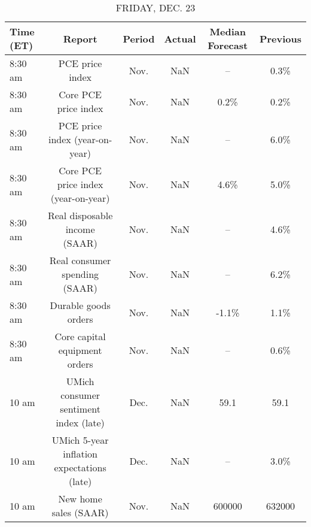 \documentclass{article}%
\begin{document}
\begin{table}[htbp]%
\caption{FRIDAY, DEC. 23}%
\centering%
\begin{adjustbox}{width=1\textwidth}%
\begin{tabular}{lccccc}
\toprule
Time (ET) &                                     Report & Period & Actual & Median Forecast & Previous \\
\midrule
  8:30 am &                            PCE price index &   Nov. &    NaN &              -- &     0.3\% \\
  8:30 am &                       Core PCE price index &   Nov. &    NaN &            0.2\% &     0.2\% \\
  8:30 am &             PCE price index (year-on-year) &   Nov. &    NaN &              -- &     6.0\% \\
  8:30 am &        Core PCE price index (year-on-year) &   Nov. &    NaN &            4.6\% &     5.0\% \\
  8:30 am &              Real disposable income (SAAR) &   Nov. &    NaN &              -- &     4.6\% \\
  8:30 am &              Real consumer spending (SAAR) &   Nov. &    NaN &              -- &     6.2\% \\
  8:30 am &                       Durable goods orders &   Nov. &    NaN &           -1.1\% &     1.1\% \\
  8:30 am &              Core capital equipment orders &   Nov. &    NaN &              -- &     0.6\% \\
    10 am &      UMich consumer sentiment index (late) &   Dec. &    NaN &            59.1 &     59.1 \\
    10 am & UMich 5-year inflation expectations (late) &   Dec. &    NaN &              -- &     3.0\% \\
    10 am &                      New home sales (SAAR) &   Nov. &    NaN &          600000 &   632000 \\
\bottomrule
\end{tabular}
%
\end{adjustbox}%
\end{table}
\end{document}
